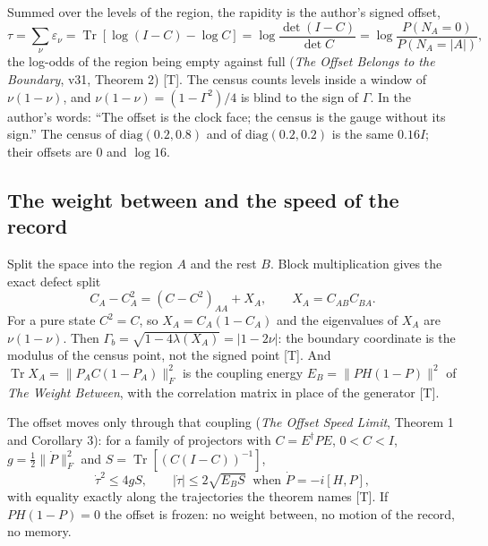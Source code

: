 \documentclass[11pt]{article}
\theoremstyle{definition}
\newcommand{\grade}[1]{\textsf{\small[#1]}}
\newcommand{\Tr}{\operatorname{Tr}}
\begin{document}
Summed over the levels of the region, the rapidity is the author's signed offset,
\begin{equation}
\tau=\sum_\nu \varepsilon_\nu=\Tr[\log(I-C)-\log C]=\log\frac{\det(I-C)}{\det C}=\log\frac{P(N_A=0)}{P(N_A=|A|)},
\end{equation}
the log-odds of the region being empty against full (\emph{The Offset Belongs to the Boundary}, v31, Theorem 2) \grade{T}. The census counts levels inside a window of $\nu(1-\nu)$, and $\nu(1-\nu)=(1-\Gamma^2)/4$ is blind to the sign of $\Gamma$. In the author's words: ``The offset is the clock face; the census is the gauge without its sign.'' The census of $\mathrm{diag}(0.2,0.8)$ and of $\mathrm{diag}(0.2,0.2)$ is the same $0.16I$; their offsets are $0$ and $\log16$.

\subsection{The weight between and the speed of the record}
Split the space into the region $A$ and the rest $B$. Block multiplication gives the exact defect split
\begin{equation}
C_A-C_A^2=(C-C^2)_{AA}+X_A,\qquad X_A=C_{AB}C_{BA}.
\label{eq:split}
\end{equation}
For a pure state $C^2=C$, so $X_A=C_A(1-C_A)$ and the eigenvalues of $X_A$ are $\nu(1-\nu)$. Then $\Gamma_b=\sqrt{1-4\lambda(X_A)}=|1-2\nu|$: the boundary coordinate is the modulus of the census point, not the signed point \grade{T}. And $\Tr X_A=\|P_AC(1-P_A)\|_F^2$ is the coupling energy $E_B=\|PH(1-P)\|^2$ of \emph{The Weight Between}, with the correlation matrix in place of the generator \grade{T}.

The offset moves only through that coupling (\emph{The Offset Speed Limit}, Theorem 1 and Corollary 3): for a family of projectors with $C=E^\dagger PE$, $0<C<I$, $g=\tfrac12\|\dot P\|_F^2$ and $S=\Tr[(C(I-C))^{-1}]$,
\begin{equation}
\dot\tau^2\le4gS,\qquad |\dot\tau|\le2\sqrt{E_BS}\ \text{ when }\dot P=-i[H,P],
\end{equation}
with equality exactly along the trajectories the theorem names \grade{T}. If $PH(1-P)=0$ the offset is frozen: no weight between, no motion of the record, no memory.
\end{document}
